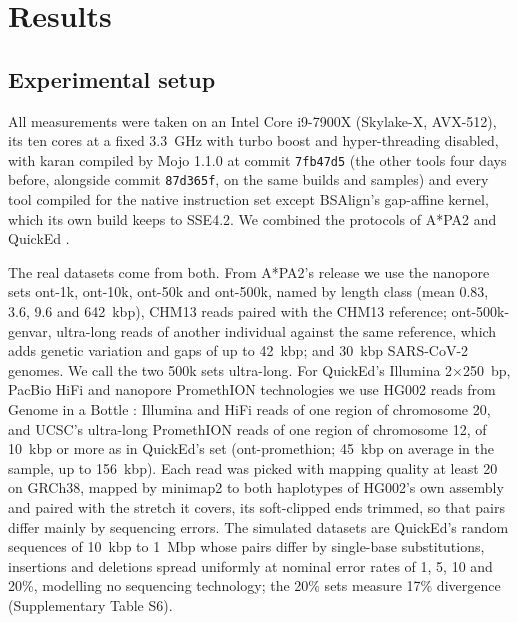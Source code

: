 \section{Results}

\subsection{Experimental setup}

All measurements were taken on an Intel Core i9-7900X (Skylake-X, AVX-512), its ten cores at a fixed 3.3~GHz with turbo boost and hyper-threading disabled, with karan compiled by Mojo 1.1.0 \citep{Modular2025mojo} at commit \texttt{7fb47d5} (the other tools four days before, alongside commit \texttt{87d365f}, on the same builds and samples) and every tool compiled for the native instruction set except BSAlign's gap-affine kernel, which its own build keeps to SSE4.2. We combined the protocols of A*PA2 \citep{GrootKoerkamp2024astarpa2} and QuickEd \citep{Doblas2025quicked}.

The real datasets come from both. From A*PA2's release \citep{GrootKoerkamp2024pabench} we use the nanopore sets ont-1k, ont-10k, ont-50k and ont-500k, named by length class (mean 0.83, 3.6, 9.6 and 642~kbp), CHM13 reads paired with the CHM13 reference; ont-500k-genvar, ultra-long reads of another individual against the same reference, which adds genetic variation and gaps of up to 42~kbp; and 30~kbp SARS-CoV-2 genomes. We call the two 500k sets ultra-long. For QuickEd's Illumina 2$\times$250~bp, PacBio HiFi and nanopore PromethION technologies we use HG002 reads from Genome in a Bottle \citep{Zook2016giab}: Illumina and HiFi reads of one region of chromosome 20, and UCSC's ultra-long PromethION reads \citep{Shafin2020shasta} of one region of chromosome 12, of 10~kbp or more as in QuickEd's set (ont-promethion; 45~kbp on average in the sample, up to 156~kbp). Each read was picked with mapping quality at least 20 on GRCh38, mapped by minimap2 \citep{Li2018minimap2} to both haplotypes of HG002's own assembly \citep{Hansen2025hg002} and paired with the stretch it covers, its soft-clipped ends trimmed, so that pairs differ mainly by sequencing errors. The simulated datasets are QuickEd's random sequences \citep{Doblas2024datasets} of 10~kbp to 1~Mbp whose pairs differ by single-base substitutions, insertions and deletions spread uniformly at nominal error rates of 1, 5, 10 and 20\%, modelling no sequencing technology; the 20\% sets measure 17\% divergence (Supplementary Table S6).

